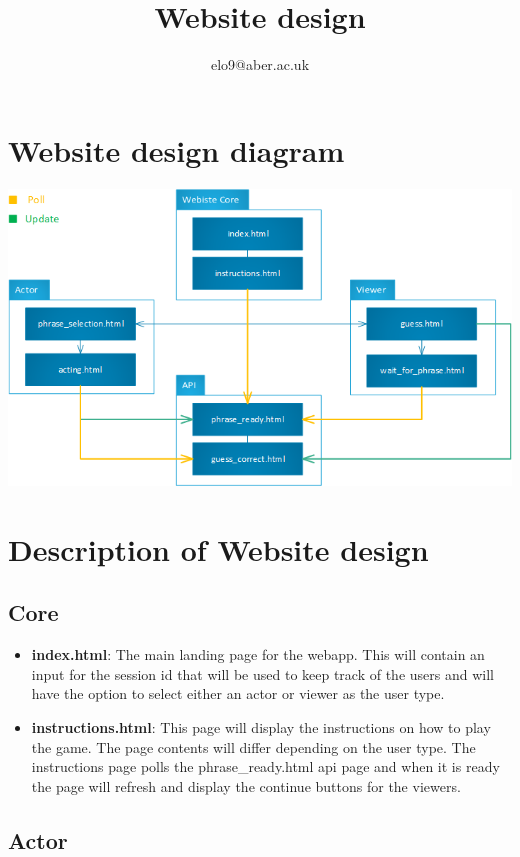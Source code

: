 \documentclass{article}
\title{Website design}
\author{elo9@aber.ac.uk}
\begin{document}
\maketitle
\tableofcontents

\newpage

\section{Website design diagram}
\includegraphics[width=\textwidth]{WebsiteDesign.png}


\section{Description of Website design}
\subsection{Core}
\begin{itemize}
	\item \textbf{index.html}: The main landing page for the webapp. This will contain an input for the session id that will be used to keep track of the users and will have the option to select either an actor or viewer as the user type.
	
	\item \textbf{instructions.html}: This page will display the instructions on how to play the game. The page contents will differ depending on the user type. The instructions page polls the phrase\_ready.html api page and when it is ready the page will refresh and display the continue buttons for the viewers. 
\end{itemize}


\subsection{Actor}
\end{document}

